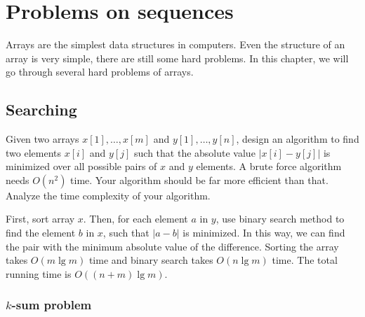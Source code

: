 \chapter{Problems on sequences}
Arrays are the simplest data structures in computers. Even the structure of an array is very simple, there are still some hard problems. In this chapter, we will go through several hard problems of arrays.

\section{Searching}

\begin{Exercise}
Given two arrays $x[1], \dots, x[m]$ and $y[1], \dots, y[n]$, design an algorithm to find two elements $x[i]$ and $y[j]$ such that the absolute value $|x[i] - y[j]|$ is minimized over all possible pairs of $x$ and $y$ elements. A brute force algorithm needs $O(n^2)$ time. Your algorithm should be far more efficient than that. Analyze the time complexity of your algorithm.
\end{Exercise}
\begin{Answer}
First, sort array $x$. Then, for each element $a$ in $y$, use binary search method to find the element $b$ in $x$, such that $|a - b|$ is minimized. In this way, we can find the pair with the minimum absolute value of the difference. Sorting the array takes $O(m \lg m)$ time and binary search takes $O(n \lg m)$ time. The total running time is $O((n + m) \lg m)$.
\end{Answer}

\subsection{$k$-sum problem}

